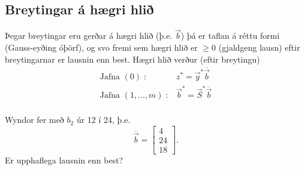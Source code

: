 \subsection{Breytingar á hægri  hlið}
Þegar breytingar eru gerðar á hægri hlið (þ.e. $\vec{b}$) þá er taflan á réttu formi (Gauss-eyðing óþörf), og svo fremi sem hægri hlið er $\geq0$ (gjaldgeng lausn) eftir breytingarnar er lausnin enn best. Hægri hlið verður (eftir breytingu)
 \begin{eqnarray*}
 \textrm{Jafna }(0) \;:& z^*=\vec{y}^*\overline{\vec{b}} \\
 \textrm{Jafna }(1,...,m)\;: & \vec{b}^*=\vec{S}^*\overline{\vec{b}} \\
 \end{eqnarray*}
 \begin{daemi}\label{wyndor:naemni1} Wyndor fer með $b_2$ úr 12 í 24, þ.e. $$\overline{\vec{b}}=\begin{bmatrix}4\\24\\18\end{bmatrix}.$$ Er upphaflega lausnin enn best?
 \end{daemi}
